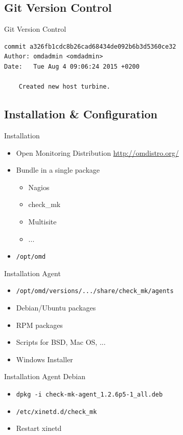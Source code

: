 \subsection{Git Version Control}
\begin{frame}[fragile]{Git Version Control}
\begin{lstlisting}
commit a326fb1cdc8b26cad68434de092b6b3d5360ce32
Author: omdadmin <omdadmin>
Date:   Tue Aug 4 09:06:24 2015 +0200

    Created new host turbine.

\end{lstlisting}
\end{frame}

\subsection{Installation \& Configuration}

\begin{frame}[fragile]{Installation}
\begin{itemize}
\item Open Monitoring Distribution \url{http://omdistro.org/}
\item Bundle in a single package
\begin{itemize}
\item Nagios
\item check\_mk
\item Multisite
\item ...
\end{itemize}
\item \verb|/opt/omd|
\end{itemize}
\end{frame}

\begin{frame}[fragile]{Installation Agent}
\begin{itemize}
\item \verb|/opt/omd/versions/.../share/check_mk/agents|
\item Debian/Ubuntu packages
\item RPM packages
\item Scripts for BSD, Mac OS, ...
\item Windows Installer
\end{itemize}
\end{frame}

\begin{frame}[fragile]{Installation Agent Debian}
\begin{itemize}
\item\verb|dpkg -i check-mk-agent_1.2.6p5-1_all.deb|
\item \verb|/etc/xinetd.d/check_mk|
\item Restart xinetd 
\end{itemize}
\end{frame}

